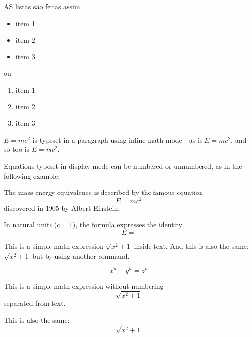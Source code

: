\documentclass[12pt]{article}
\begin{document}

AS listas são feitas assim.
\begin{itemize}
    \item item 1
    \item item 2
    \item item 3
\end{itemize}

ou

\begin{enumerate}
    \item item 1
    \item item 2
    \item item 3
\end{enumerate}




\begin{math}
    E=mc^2
\end{math}
is typeset in a paragraph using inline math mode---as is $E=mc^2$, and so too is \(E=mc^2\).

Equations typeset in display mode can be numbered or unnumbered, as in the following example:

The mass-energy equivalence is described by the famous equation
\[ E=mc^2 \] discovered in 1905 by Albert Einstein. 

In natural units ($c = 1$), the formula expresses the identity
\begin{equation}
E=                              %
\end{equation}

This is a simple math expression \(\sqrt{x^2+1}\) inside text. 
And this is also the same: 
\begin{math}
\sqrt{x^2+1}
\end{math}
but by using another command.

\[ x^n + y^n = z^n \]


This is a simple math expression without numbering
\[\sqrt{x^2+1}\] 
separated from text.

This is also the same:
\begin{displaymath}
\sqrt{x^2+1}
\end{displaymath}
\end{document}
